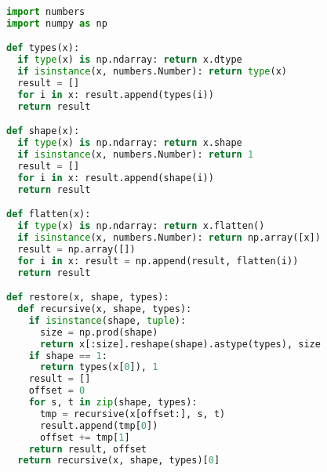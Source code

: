 \begin{lstlisting}[label=lst:deepflat, language=python, caption=deepflatten.py]
import numbers
import numpy as np

def types(x):
  if type(x) is np.ndarray: return x.dtype
  if isinstance(x, numbers.Number): return type(x)
  result = []
  for i in x: result.append(types(i))
  return result

def shape(x):
  if type(x) is np.ndarray: return x.shape
  if isinstance(x, numbers.Number): return 1
  result = []
  for i in x: result.append(shape(i))
  return result

def flatten(x):
  if type(x) is np.ndarray: return x.flatten()
  if isinstance(x, numbers.Number): return np.array([x])
  result = np.array([])
  for i in x: result = np.append(result, flatten(i))
  return result

def restore(x, shape, types):
  def recursive(x, shape, types):
    if isinstance(shape, tuple):
      size = np.prod(shape)
      return x[:size].reshape(shape).astype(types), size
    if shape == 1:
      return types(x[0]), 1
    result = []
    offset = 0
    for s, t in zip(shape, types):
      tmp = recursive(x[offset:], s, t)
      result.append(tmp[0])
      offset += tmp[1]
    return result, offset
  return recursive(x, shape, types)[0]
\end{lstlisting}

